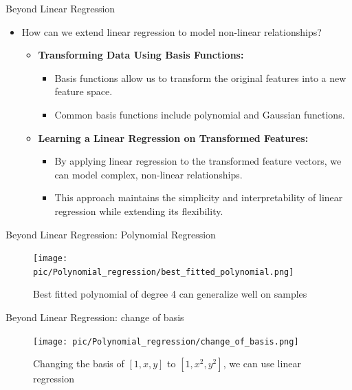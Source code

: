 \documentclass[serif, aspectratio=169]{beamer}
\begin{document}
    \begin{frame}{Beyond Linear Regression}
        \begin{itemize}
            \item How can we extend linear regression to model non-linear relationships?
            \begin{itemize}
                \item \textbf{Transforming Data Using Basis Functions:}
                \begin{itemize}
                    \item Basis functions allow us to transform the original features into a new feature space.
                    \item Common basis functions include polynomial and Gaussian functions.
                \end{itemize}
                \item \textbf{Learning a Linear Regression on Transformed Features:}
                \begin{itemize}
                    \item By applying linear regression to the transformed feature vectors, we can model complex, non-linear relationships.
                    \item This approach maintains the simplicity and interpretability of linear regression while extending its flexibility.
                \end{itemize}
            \end{itemize}
        \end{itemize}
    \end{frame}

    \begin{frame}{Beyond Linear Regression: Polynomial Regression}
        \begin{figure}[h]
            \centering
            \texttt{[image: pic/Polynomial\_regression/best\_fitted\_polynomial.png]}
            \caption{Best fitted polynomial of degree 4 can generalize well on samples}
        \end{figure}
    \end{frame}


    \begin{frame}{Beyond Linear Regression: change of basis}
        \begin{figure}[h]
            \centering
            \texttt{[image: pic/Polynomial\_regression/change\_of\_basis.png]}
            \caption{Changing the basis of \( [1, x, y] \) to \( [1, x^2, y^2] \), we can use linear regression}
        \end{figure}
    \end{frame}
\end{document}
